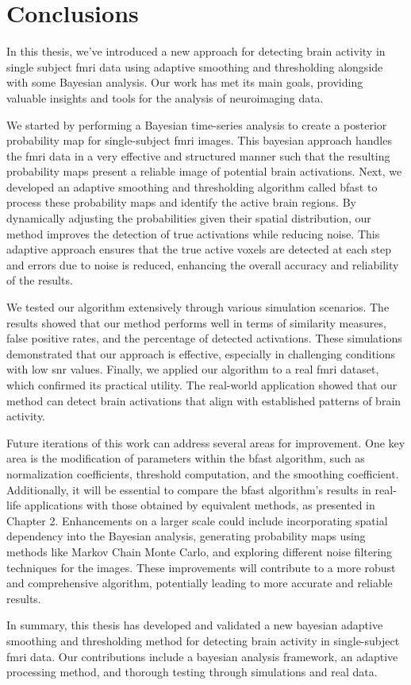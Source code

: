 \chapter{Conclusions}

In this thesis, we've introduced a new approach for detecting brain activity 
in single subject \gls{fmri} data using adaptive smoothing and 
thresholding alongside with some Bayesian analysis. Our work has met its 
main goals, providing valuable 
insights and tools for the analysis of neuroimaging data.

We started by performing a Bayesian time-series analysis to create a 
posterior probability map for single-subject \gls{fmri} images. This bayesian 
approach handles the \gls{fmri} data in a very effective and structured manner 
such that the resulting probability maps present a reliable image 
of potential brain activations. Next, we developed an adaptive smoothing and 
thresholding algorithm called \gls{bfast} to process these probability maps and 
identify the active brain regions. By dynamically adjusting the probabilities 
given their spatial distribution, our method improves the detection of true 
activations while reducing noise. This adaptive approach ensures that the true 
active voxels are detected at each step and errors due to noise is reduced, enhancing 
the overall accuracy and reliability of the results.

We tested our algorithm extensively through various simulation scenarios. 
The results showed that our method performs well in terms of similarity 
measures, false positive rates, and the percentage of detected activations. 
These simulations demonstrated that our approach is effective, 
especially in challenging conditions with low \gls{snr} values. Finally, we applied our 
algorithm to a real \gls{fmri} dataset, which confirmed 
its practical utility. The real-world application showed that our method 
can detect brain activations that align with established patterns 
of brain activity. 

Future iterations of this work can address several areas for improvement. One key 
area is the modification of parameters within the \gls{bfast} algorithm, such as 
normalization coefficients, threshold computation, and the smoothing coefficient. 
Additionally, it will be essential to compare the \gls{bfast} algorithm's results 
in real-life applications with those obtained by equivalent methods, as presented 
in Chapter 2. Enhancements on a larger scale could include incorporating spatial 
dependency into the Bayesian analysis, generating probability maps using methods 
like Markov Chain Monte Carlo, and exploring different noise filtering techniques 
for the images. These improvements will contribute to a more robust and comprehensive 
algorithm, potentially leading to more accurate and reliable results.

In summary, this thesis has developed and validated a new bayesian adaptive 
smoothing and thresholding method for detecting brain activity in single-subject 
\gls{fmri} data. Our contributions include a bayesian analysis framework, 
an adaptive processing method, and thorough testing through simulations and 
real data.
